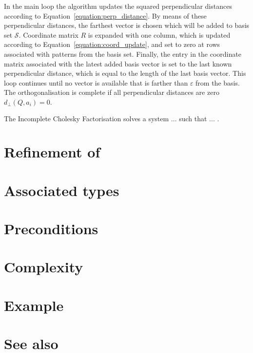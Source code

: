 \documentclass{article}
\newcommand{\sv}{Q}
\newcommand{\nonsve}{a}
\newcommand{\coordm}{R}
\begin{document}
In the main loop the algorithm updates the squared perpendicular distances
according to Equation~\ref{equation:perp_distance}. By means of
these perpendicular distances, the farthest vector is chosen which
will be added to basis set $\mathcal{S}$. Coordinate matrix $\coordm$
is expanded with one column, which is updated according to 
Equation~\ref{equation:coord_update},
and set to zero at rows associated with patterns from the basis set.
Finally, the entry in the coordinate matrix associated with the latest
added basis vector is set to the last known perpendicular distance,
which is equal to the length of the last basis vector. This loop continues
until no vector is available that is farther than $\varepsilon$ from
the basis. The orthogonalisation is complete if all perpendicular
distances are zero $d_{\perp}(\sv,\nonsve_{i})=0$. 


The Incomplete Cholesky Factorisation solves a system ... such that ... . 


\section*{Refinement of}


\section*{Associated types}

\section*{Preconditions}


\section*{Complexity}

\section*{Example}


\section*{See also}






\end{document}
